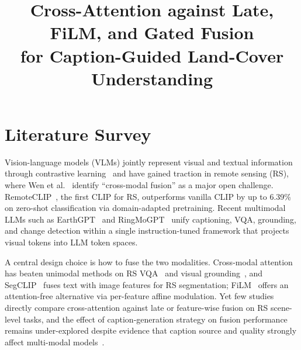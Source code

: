 \documentclass[conference]{IEEEtran}
\begin{document}
\title{\large Cross-Attention against Late, FiLM, and Gated Fusion\\for Caption-Guided Land-Cover Understanding}

\author{
}

\maketitle


\section{Literature Survey}

Vision-language models (VLMs) jointly represent visual and textual information through contrastive learning~\cite{radford2021clip} and have gained traction in remote sensing (RS), where Wen et al.~\cite{wen2024vlm} identify ``cross-modal fusion'' as a major open challenge. RemoteCLIP~\cite{liu2024remoteclip}, the first CLIP for RS, outperforms vanilla CLIP by up to 6.39\% on zero-shot classification via domain-adapted pretraining. Recent multimodal LLMs such as EarthGPT~\cite{zhang2024earthgpt} and RingMoGPT~\cite{wang2025ringmogpt} unify captioning, VQA, grounding, and change detection within a single instruction-tuned framework that projects visual tokens into LLM token spaces.

A central design choice is how to fuse the two modalities. Cross-modal attention has beaten unimodal methods on RS VQA~\cite{bazi2022bimodal} and visual grounding~\cite{lan2024grounding}, and SegCLIP~\cite{zhang2024segclip} fuses text with image features for RS segmentation; FiLM~\cite{perez2018film} offers an attention-free alternative via per-feature affine modulation. Yet few studies directly compare cross-attention against late or feature-wise fusion on RS scene-level tasks, and the effect of caption-generation strategy on fusion performance remains under-explored despite evidence that caption source and quality strongly affect multi-modal models~\cite{chen2024sharegpt4v}.
\end{document}
